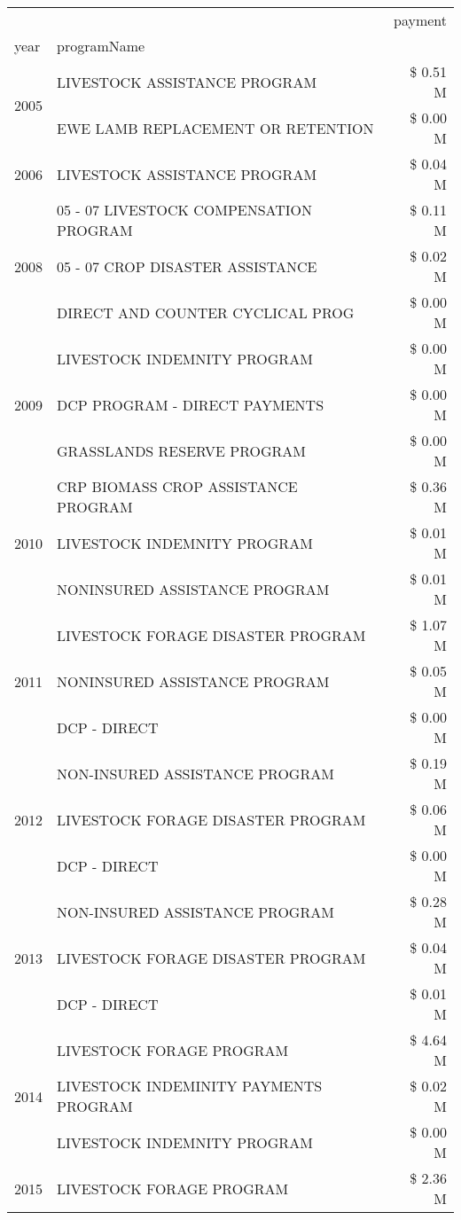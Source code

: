 \begin{tabular}{llr}
\toprule
 &  & payment \\
year & programName &  \\
\midrule
\multirow[t]{2}{*}{2005} & LIVESTOCK ASSISTANCE PROGRAM & \$ 0.51 M \\
 & EWE LAMB REPLACEMENT OR RETENTION & \$ 0.00 M \\
\cline{1-3}
2006 & LIVESTOCK ASSISTANCE PROGRAM & \$ 0.04 M \\
\cline{1-3}
\multirow[t]{3}{*}{2008} & 05 - 07 LIVESTOCK COMPENSATION PROGRAM & \$ 0.11 M \\
 & 05 - 07 CROP DISASTER ASSISTANCE & \$ 0.02 M \\
 & DIRECT AND COUNTER CYCLICAL PROG & \$ 0.00 M \\
\cline{1-3}
\multirow[t]{3}{*}{2009} & LIVESTOCK INDEMNITY PROGRAM & \$ 0.00 M \\
 & DCP PROGRAM - DIRECT PAYMENTS & \$ 0.00 M \\
 & GRASSLANDS RESERVE PROGRAM & \$ 0.00 M \\
\cline{1-3}
\multirow[t]{3}{*}{2010} & CRP BIOMASS CROP ASSISTANCE PROGRAM & \$ 0.36 M \\
 & LIVESTOCK INDEMNITY PROGRAM & \$ 0.01 M \\
 & NONINSURED ASSISTANCE PROGRAM & \$ 0.01 M \\
\cline{1-3}
\multirow[t]{3}{*}{2011} & LIVESTOCK FORAGE DISASTER PROGRAM & \$ 1.07 M \\
 & NONINSURED ASSISTANCE PROGRAM & \$ 0.05 M \\
 & DCP - DIRECT & \$ 0.00 M \\
\cline{1-3}
\multirow[t]{3}{*}{2012} & NON-INSURED ASSISTANCE PROGRAM & \$ 0.19 M \\
 & LIVESTOCK FORAGE DISASTER PROGRAM & \$ 0.06 M \\
 & DCP - DIRECT & \$ 0.00 M \\
\cline{1-3}
\multirow[t]{3}{*}{2013} & NON-INSURED ASSISTANCE PROGRAM & \$ 0.28 M \\
 & LIVESTOCK FORAGE DISASTER PROGRAM & \$ 0.04 M \\
 & DCP - DIRECT & \$ 0.01 M \\
\cline{1-3}
\multirow[t]{3}{*}{2014} & LIVESTOCK FORAGE PROGRAM & \$ 4.64 M \\
 & LIVESTOCK INDEMINITY PAYMENTS PROGRAM & \$ 0.02 M \\
 & LIVESTOCK INDEMNITY PROGRAM & \$ 0.00 M \\
\cline{1-3}
\multirow[t]{3}{*}{2015} & LIVESTOCK FORAGE PROGRAM & \$ 2.36 M \\

\end{tabular}
